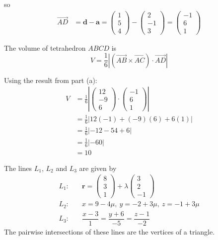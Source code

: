 \documentclass[leqno]{article}
\begin{document}
\begin{enumerate}[
  label=\textbf{\arabic*.},
  leftmargin=*,
  topsep=0pt,
  partopsep=0pt,
  parsep=0pt
]
\begin{djsSolution}
\begin{enumerate}[label=\textbf{(\alph*)}]
so
\begin{align*}
\overrightarrow{AD}
&=\mathbf{d}-\mathbf{a}
=\begin{pmatrix}1\\5\\4\end{pmatrix}-\begin{pmatrix}2\\-1\\3\end{pmatrix}
=\begin{pmatrix}-1\\6\\1\end{pmatrix}
\end{align*}

The volume of tetrahedron \(ABCD\) is
\[
V=\frac16\left|(\overrightarrow{AB}\times\overrightarrow{AC})\cdot\overrightarrow{AD}\right|
\]

Using the result from part (a):
\begin{align*}
V
&=\frac{1}{6}\left|\begin{pmatrix}12\\-9\\6\end{pmatrix}\cdot\begin{pmatrix}-1\\6\\1\end{pmatrix}\right| \\
&=\frac{1}{6}\left|12(-1)+(-9)(6)+6(1)\right| \\
&=\frac{1}{6}\left|-12-54+6\right| \\
&=\frac{1}{6}\left|-60\right| \\
&=10
\end{align*}
\end{enumerate}
\end{djsSolution}


\newpage

\questionitem

The lines $L_1$, $L_2$ and $L_3$ are given by
\begin{align*}
L_1: &\quad \mathbf{r}=\begin{pmatrix}8\\3\\1\end{pmatrix}+\lambda\begin{pmatrix}3\\2\\-1\end{pmatrix}\\[6pt]
L_2: &\quad x=9-4\mu,\ y=-2+3\mu,\ z=-1+3\mu\\[6pt]
L_3: &\quad \dfrac{x-3}{1}=\dfrac{y+6}{-5}=\dfrac{z-1}{-2}
\end{align*}
The pairwise intersections of these lines are the vertices of a triangle. \\


\end{enumerate}
\end{document}
